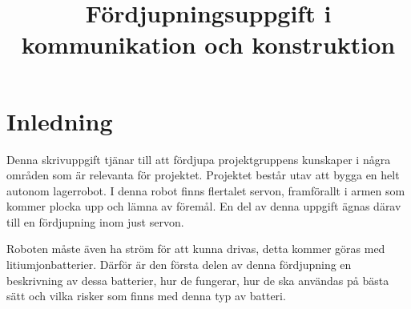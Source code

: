 \documentclass[a4paper,12pt]{article}
\title{Fördjupningsuppgift i kommunikation och konstruktion}
\renewcommand{\thepage}{\roman{page}}
\begin{document}
\LIPStitelsida

\begin{LIPSprojektidentitet}
\end{LIPSprojektidentitet}


\renewcommand*\contentsname{Innehåll}
\begin{spacing}{0.5}
\tableofcontents{}
\end{spacing}
\newpage

\begin{LIPSdokumenthistorik}
\end{LIPSdokumenthistorik}
\newpage

\renewcommand{\thepage}{\arabic{page}}
\setcounter{page}{1}

\section{Inledning}
Denna skrivuppgift tjänar till att fördjupa projektgruppens kunskaper i några områden som är relevanta för projektet. Projektet består utav att bygga en helt autonom lagerrobot. I denna robot finns flertalet servon, framförallt i armen som kommer plocka upp och lämna av föremål. En del av denna uppgift ägnas därav till en fördjupning inom just servon.

Roboten måste även ha ström för att kunna drivas, detta kommer göras med litiumjonbatterier. Därför är den första delen av denna fördjupning en beskrivning av dessa batterier, hur de fungerar, hur de ska användas på bästa sätt och vilka risker som finns med denna typ av batteri.
\end{document}
